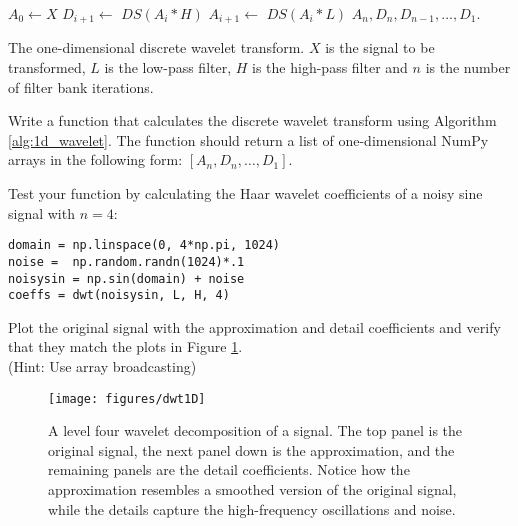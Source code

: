 \begin{algorithm}[H]
\begin{algorithmic}[1]
    \State $A_0 \gets X$            
        \State $D_{i+1} \gets \,\,DS(A_i * H)$ 
        \State $A_{i+1} \gets \,\,DS(A_i * L)$ 
    \EndFor
    \State {} $A_n,D_n, D_{n-1},\ldots, D_1$.
\EndProcedure
\end{algorithmic}
\caption{The one-dimensional discrete wavelet transform. $X$ is the signal to be transformed, $L$ is the low-pass filter, $H$ is the high-pass filter and $n$ is the number of
filter bank iterations.}
\label{alg:1d_wavelet}
\end{algorithm}

\begin{problem}
Write a function that calculates the discrete wavelet transform using Algorithm \ref{alg:1d_wavelet}.
The function should return a list of one-dimensional NumPy arrays in the following form: $[A_n, D_n, \ldots, D_1]$.


Test your function by calculating the Haar wavelet coefficients of a noisy sine signal with $n=4$:

\begin{lstlisting}
domain = np.linspace(0, 4*np.pi, 1024)
noise =  np.random.randn(1024)*.1
noisysin = np.sin(domain) + noise
coeffs = dwt(noisysin, L, H, 4)
\end{lstlisting}

Plot the original signal with the approximation and detail coefficients and verify that they match the plots in Figure \ref{fig:dwt1D}.
\\ (Hint: Use array broadcasting)
\label{prob:dwt1D}
\end{problem}

\begin{figure}[H]
\centering
\texttt{[image: figures/dwt1D]}
\caption{A level four wavelet decomposition of a signal.
The top panel is the original signal, the next panel down is the approximation, and the remaining panels are the detail coefficients.
Notice how the approximation resembles a smoothed version of the original signal, while the details capture the high-frequency oscillations and noise.}
\label{fig:dwt1D}
\end{figure}

